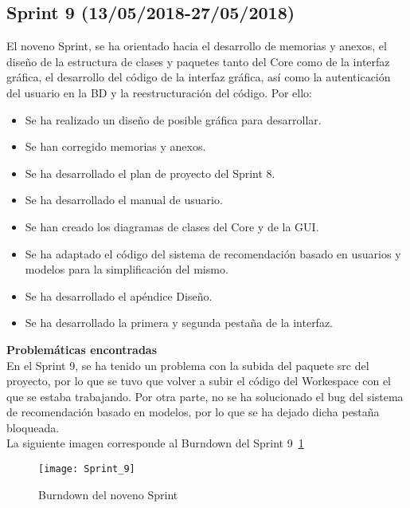 \subsection{\textbf{Sprint 9} (13/05/2018-27/05/2018) }
El noveno  Sprint, se ha orientado hacia el desarrollo de memorias y anexos, el diseño de la estructura de clases y paquetes tanto del Core como de la interfaz gráfica, el desarrollo del código de la interfaz gráfica, así como la autenticación del usuario en la BD y la reestructuración del código. 
Por ello: 
\begin{itemize}
\item Se ha realizado un diseño de posible gráfica para desarrollar. 
\item Se han corregido memorias y anexos.
\item Se ha desarrollado el plan de proyecto del Sprint 8.
\item Se ha desarrollado el manual de usuario.
\item Se han creado los diagramas de clases del Core y de la GUI. 
\item Se ha adaptado el código del sistema de recomendación basado en usuarios y modelos para la simplificación del mismo. 
\item Se ha desarrollado el apéndice Diseño. 
\item Se ha desarrollado la primera y segunda pestaña de la interfaz. 
\end{itemize}
\textbf{Problemáticas encontradas}\\En el Sprint 9, se ha tenido un problema con la subida del paquete src del proyecto, por lo que se tuvo que  volver a subir el código del Workespace con el que se estaba trabajando. Por otra parte, no se ha solucionado el  bug del sistema de recomendación basado en modelos, por lo que se ha dejado dicha pestaña bloqueada. 
 \\La siguiente imagen corresponde al Burndown del Sprint 9~\ref{fig:A.2.9}
\begin{figure}[h]
\centering
\texttt{[image: Sprint\_9]}
\caption{Burndown del noveno Sprint}
\label{fig:A.2.9}
\end{figure}
\\
